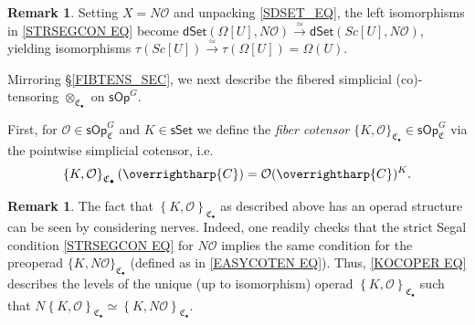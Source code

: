 \documentclass[a4paper,10pt
,draft
]{article}%
\numberwithin{equation}{section}
\numberwithin{figure}{section}
\theoremstyle{definition} %
\newtheorem{remark}[equation]{Remark}%
\newcommand{\set}[1]{\left\{#1\right\}}%
\newcommand{\vect}[1]{\text{\overrightharp{\ensuremath{#1}}}}
\renewcommand{\O}{\ensuremath{\mathcal O}}
\newcommand{\1}{\ensuremath{\mathbbm 1}}%
\begin{document}
\begin{remark}\label{TAUSC REM}
	Setting $X=N\O$ and unpacking \eqref{SDSET_EQ},
	the left isomorphisms in \eqref{STRSEGCON EQ}
	become
	$\mathsf{dSet}(\Omega[U],N\O)
	\xrightarrow{\simeq} 
	\mathsf{dSet}(Sc[U],N\O)$,
	yielding isomorphisms
	$\tau(Sc[U]) \xrightarrow{\simeq} \tau(\Omega[U])=\Omega(U)$.
\end{remark}


Mirroring \S \ref{FIBTENS_SEC},
we next describe the fibered simplicial (co)-tensoring
$\otimes_{\mathfrak{C}_{\bullet}}$
on $\mathsf{sOp}^G$.

First, for $\O \in \mathsf{sOp}^G_{\mathfrak{C}}$
and 
$K \in \mathsf{sSet}$
we define the \emph{fiber cotensor}
$\{K,\O\}_{\mathfrak{C}_{\bullet}} 
\in \mathsf{sOp}^G_{\mathfrak{C}}$
via the pointwise simplicial cotensor, i.e.
\begin{equation}\label{KOCOPER EQ}
	\set{K, \O}_{\mathfrak{C}_{\bullet}} (\vect C) = \O(\vect C)^K.
\end{equation}


\begin{remark}\label{NERTENID REM}
	The fact that 
	$\set{K, \O}_{\mathfrak{C}_{\bullet}}$
	as described above has an operad structure
	can be seen by considering nerves. 
	Indeed, 
	one readily checks that the strict Segal condition
	\eqref{STRSEGCON EQ} for $N\O$ 
	implies the same condition for 
	the preoperad
	$\{K,N \O\}_{\mathfrak{C}_{\bullet}}$
	(defined as in \eqref{EASYCOTEN EQ}).
	Thus, \eqref{KOCOPER EQ}
	describes the levels
	of the unique (up to isomorphism) operad
	$\set{K, \O}_{\mathfrak{C}_{\bullet}}$
	such that
	$N\set{K, \O}_{\mathfrak{C}_{\bullet}} 
	\simeq
	\set{K, N \O}_{\mathfrak{C}_{\bullet}}$.
\end{remark}
\end{document}
